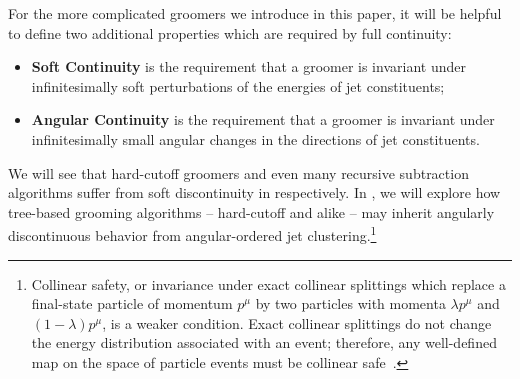 For the more complicated \PIRANHA{} groomers we introduce in this paper, it will be helpful to define two additional properties which are required by full continuity:
\begin{itemize}
    \item
    \textbf{Soft Continuity} is the requirement that a groomer is invariant under infinitesimally soft perturbations of the energies of jet constituents;

    \item
    \textbf{Angular Continuity} is the requirement that a groomer is invariant under infinitesimally small angular changes in the directions of jet constituents.
\end{itemize}

We will see that hard-cutoff groomers and even many recursive subtraction algorithms suffer from soft discontinuity in  respectively.
%
In , we will explore how tree-based grooming algorithms -- hard-cutoff and \PIRANHA{} alike -- may inherit angularly discontinuous behavior from angular-ordered jet clustering.\footnote{
Collinear safety, or invariance under exact collinear splittings which replace a final-state particle of momentum \(p^\mu\) by two particles with momenta \(\lambda p^\mu\) and \((1-\lambda) p^\mu\), is a weaker condition.
%
Exact collinear splittings do not change the energy distribution associated with an event; therefore, any well-defined map on the space of particle events must be collinear safe~\cite{Komiske:2020qhg}.
}


